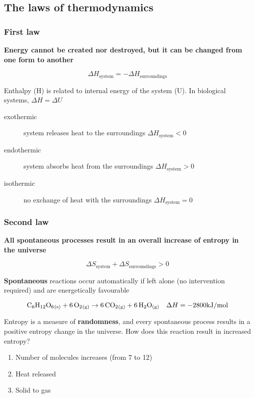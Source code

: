 \documentclass[letterpaper, 12pt]{article}
\begin{document}
\subsection*{The laws of thermodynamics}

\subsubsection*{First law}

\textbf{Energy cannot be created nor destroyed, but it can be changed from one form to another}

$$ \Delta H_\text{system} = - \Delta H_\text{surroundings} $$

Enthalpy (H) is related to internal energy of the system (U). In biological systems, $\Delta H = \Delta U$

\begin{description}
\item [exothermic] system releases heat to the surroundings $\Delta H_\text{system} < 0$
\item [endothermic] system absorbs heat from the surroundings $\Delta H_\text{system} > 0$
\item [isothermic] no exchange of heat with the surroundings $\Delta H_\text{system} = 0$
\end{description}

\subsubsection*{Second law}

\textbf{All spontaneous processes result in an overall increase of entropy in the universe}

$$ \Delta S_\text{system} + \Delta S_\text{surroundings} > 0$$

\textbf{Spontaneous} reactions occur automatically if left alone (no intervention required) and are energetically favourable

$$\ce{C6H12O6_{(s)} + 6O2_{(g)}} \to \ce{6CO2_{(g)} + 6H2O_{(g)}} \quad \Delta H = -2800 \mathrm{kJ/mol}$$

Entropy is a measure of \textbf{randomness}, and every spontaneous process results in a positive entropy change in the universe. How does this reaction result in increased entropy?

\begin{enumerate}
\item Number of molecules increases (from 7 to 12)
\item Heat released
\item Solid to gas
\end{enumerate}
\end{document}
